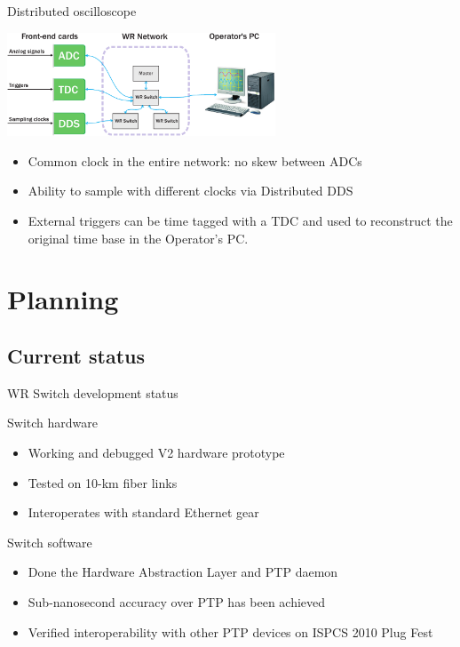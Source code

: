 \documentclass[xcolor=dvipsnames]{beamer}
\begin{document}
\begin{frame}{Distributed oscilloscope}
  \begin{center}
    \includegraphics[width=8cm]{applications/distr_oscill}
    \end{center}
    \begin{block}{}
      \begin{itemize}
      \item Common clock in the entire network: no skew between ADCs
      \item Ability to sample with different clocks via Distributed DDS
      \item External triggers can be time tagged with a TDC and used to reconstruct the original time base in the Operator's PC.
      \end{itemize}
    \end{block}
\end{frame}



\section{Planning}

\subsection{Current status}

\begin{frame}{WR Switch development status}
	\begin{block}{Switch hardware}
          \begin{itemize}
            \item Working and debugged V2 hardware prototype
            \item Tested on 10-km fiber links
            \item Interoperates with standard Ethernet gear
            \end{itemize}
            \end{block}

	\begin{block}{Switch software}
          \begin{itemize}
            \item Done the Hardware Abstraction Layer and PTP daemon 
            \item Sub-nanosecond accuracy over PTP has been achieved
            \item Verified interoperability with other PTP devices on ISPCS 2010 Plug Fest
            \end{itemize}
          \end{block}
\end{frame}
\end{document}
